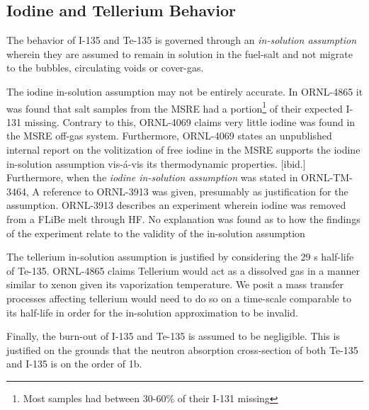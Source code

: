\subsection{Iodine and Tellerium Behavior}
The behavior of I-135 and Te-135 is governed through an \textit{in-solution assumption} wherein they are assumed to remain in solution in the fuel-salt and not migrate to the bubbles, circulating voids or cover-gas.  

The iodine in-solution assumption may not be entirely accurate. In ORNL-4865 it was found that salt samples from the MSRE had a portion\footnote{Most samples had between 30-60\% of their I-131 missing} of their expected I-131 missing. \cite[p. 28]{ORNL4865} Contrary to this, ORNL-4069 claims very little iodine was found in the MSRE off-gas system.\cite[p. 42]{ORNL4069} Furthermore, ORNL-4069 states an unpublished internal report on the volitization of free iodine in the MSRE supports the iodine in-solution assumption vis-\'a-vis its thermodynamic properties. [ibid.]  Furthermore, when the \textit{iodine in-solution assumption} was stated in ORNL-TM-3464, A reference to ORNL-3913  was given, presumably as justification for the assumption. \cite[pp. 38-40] {ORNL3913} ORNL-3913 describes an experiment wherein iodine was removed from a FLiBe melt through HF.  No explanation was found as to how the findings of the experiment relate to the validity of the in-solution assumption


The tellerium in-solution assumption is justified by considering the 29 s half-life of Te-135.\cite[p. 42]{ORNL4069}   ORNL-4865 claims Tellerium would act as a dissolved gas in a manner similar to xenon given its vaporization temperature. \cite[p. 29]{ORNL4865}  We posit a mass transfer processes affecting tellerium would need to do so on a time-scale comparable to its half-life in order for the in-solution approximation to be invalid.

Finally, the burn-out of I-135 and Te-135 is assumed to be negligible.  This is justified on the grounds that the neutron absorption cross-section of both Te-135 and I-135 is on the order of 1b.  \cite{TENDL15}